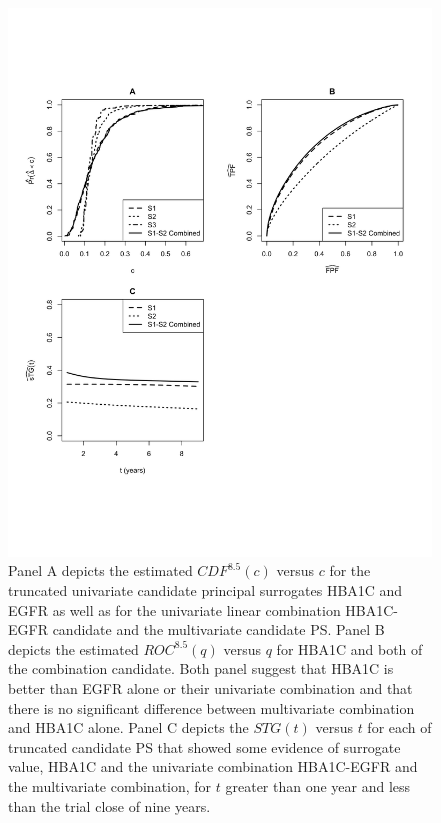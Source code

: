 \documentclass[times, doublespace]{simauth}
\begin{document}
\begin{figure}
\begin{center}
\includegraphics[scale=0.75]{dcct-example-figure-2014-6-2.pdf}
\end{center}
\caption{Panel A depicts the estimated $CDF^{8.5}(c)$ versus $c$ for the truncated univariate candidate principal surrogates HBA1C and EGFR as well as for the univariate linear combination HBA1C-EGFR candidate and the multivariate candidate PS. Panel B depicts the estimated $ROC^{8.5}(q)$ versus $q$ for HBA1C and both of the combination candidate. Both panel suggest that HBA1C is better than EGFR alone or their univariate combination and that there is no significant difference between multivariate combination and HBA1C alone. Panel C depicts the $STG(t)$ versus $t$ for each of truncated candidate PS that showed some evidence of surrogate value, HBA1C and the univariate combination HBA1C-EGFR and the multivariate combination, for $t$ greater than one year and less than the trial close of nine years. \label{exp}}
\end{figure}
\end{document}
